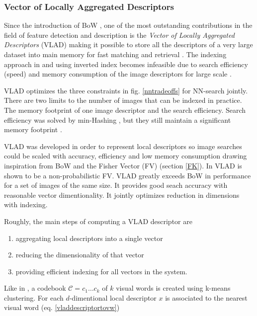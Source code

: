 \documentclass[english,12pt,a4paper,pdftex,elec,utf8]{aaltothesis}
\begin{document}
\subsubsection{Vector of Locally Aggregated Descriptors}
Since the introduction of BoW \cite{Sivic2003}, one of the most outstanding contributions in the field of feature detection and description is the \emph{Vector of Locally Aggregated Descriptors} (VLAD) making it possible to store all the descriptors of a very large dataset into main memory for fast matching and retrieval \cite{Arandjelovic2013}. The indexing approach in \cite{Sivic2003} and \cite{Jegou2008} using inverted index becomes infeasible due to search efficiency (speed) and memory consumption of the image descriptors for large scale \cite{Jegou2010}.

VLAD optimizes the three constraints in fig. \ref{nntradeoffs} for NN-search jointly. There are two limits to the number of images that can be indexed in practice. The memory footprint of one image descriptor and the search efficiency. Search efficiency was solved by min-Hashing \cite{Chum2008}, \cite{Chum2009} but they still maintain a significant memory footprint \cite{Jegou2010}.

VLAD was developed in order to represent local descriptors so image searches could be scaled with accuracy, efficiency and low memory consumption drawing inspiration from BoW and the Fisher Vector (FV) (section \ref{FK}). In \cite{Jegou2012} VLAD is shown to be a non-probabilistic FV. VLAD greatly exceeds BoW in performance for a set of images of the same size. It provides good seach accuracy with reasonable vector dimentionality. It jointly optimizes reduction in dimensions with indexing. \cite{Jegou2010}

Roughly, the main steps of computing a VLAD descriptor are
\begin{enumerate}
\item aggregating local descriptors into a single vector
\item reducing the dimensionality of that vector
\item providing efficient indexing for all vectors in the system.
\end{enumerate}

Like in \cite{Sivic2003}, \cite{Jegou2011} a codebook $\mathcal{C}={c_1 \ldots c_k}$ of $k$ visual words is created using k-means clustering. For each $d$-dimentional local descriptor $x$ is associated to the nearest visual word (eq. \ref{vladdescriptortovw})
\end{document}
